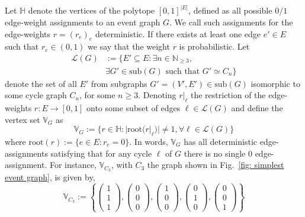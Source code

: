 \documentclass[a4paper,twocolumn,11pt,accepted=2024-01-17]{quantumarticle}
\begin{document}
{
Let $\mathbb{H}$ denote the vertices of the polytope $[0,1]^{|E|}$, defined as all possible $0/1$ edge-weight assignments to an event graph $G$. We call such assignments for the edge-weights $r = (r_e)_e$ deterministic. If there exists at least one edge $e' \in E$ such that $r_e \in (0,1)$ we say that the weight $r$ is probabilistic. Let \begin{align*}
\mathcal{L}(G) &:= \{ E' \subseteq E : \exists n \in \mathbb{N}_{\geq 3},\\&\exists G' \in \text{sub}(G) \text{ such that } G' \simeq C_n\}
\end{align*}denote the set of all $E'$ from subgraphs $G'=(V',E') \in \text{sub}(G)$  isomorphic to some cycle graph $C_n$, for some $n\geq 3$. Denoting $r\vert_{\ell}$ the restriction of the edge-weights $r: E \to [0,1]$ onto some subset of edges $\ell \in \mathcal{L}(G)$ and define the vertex set $\mathbb{V}_G$ as
\begin{equation}
    \mathbb{V}_G := \{r \in \mathbb{H}: |\text{root}(r|_{\ell})| \neq 1, \forall \ell \in \mathcal{L}(G)\}
\end{equation} 
where $\text{root}(r) := \{e \in E: r_e = 0\}$. In words, $\mathbb{V}_G$ has all deterministic edge-assignments satisfying that for any cycle $\ell$ of $G$ there is no single $0$ edge-assignment. For instance, $\mathbb{V}_{C_3}$, with $C_3$ the graph shown in Fig.~\ref{fig: simplest event graph},  is given by,
\begin{equation*}
    \mathbb{V}_{C_3}:=\left\{ \left(\begin{matrix}1\\1\\1\end{matrix}\right), \left(\begin{matrix}0\\0\\0\end{matrix}\right), \left(\begin{matrix}1\\0\\0\end{matrix}\right),\left(\begin{matrix}0\\1\\0\end{matrix}\right), \left(\begin{matrix}0\\0\\1\end{matrix}\right) \right\}

\end{equation*}}
\end{document}
